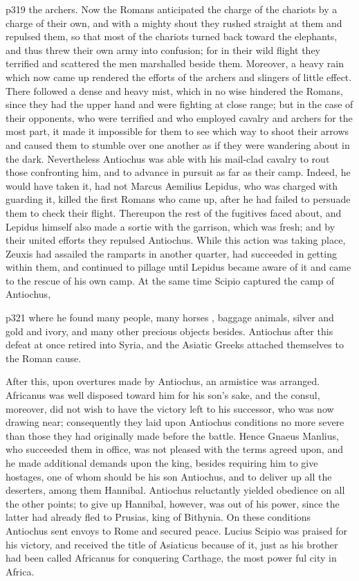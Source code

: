 p319 the archers. Now the Romans anticipated the charge of the chariots by a charge of their own, and with a mighty shout they rushed straight at them and repulsed them, so that most of the chariots turned back toward the elephants, and thus threw their own army into confusion; for in their wild flight they terrified and scattered the men marshalled beside them. Moreover, a heavy rain which now came up rendered the efforts of the archers and slingers of little effect. There followed a dense and heavy mist, which in no wise hindered the Romans, since they had the upper hand and were fighting at close range; but in the case of their opponents, who were terrified and who employed cavalry and archers for the most part, it made it impossible for them to see which way to shoot their arrows and caused them to stumble over one another as if they were wandering about in the dark. Nevertheless Antiochus was able with his mail-clad cavalry to rout those confronting him, and to advance in pursuit as far as their camp. Indeed, he would have taken it, had not Marcus Aemilius Lepidus, who was charged with guarding it, killed the first Romans who came up, after he had failed to persuade them to check their flight. Thereupon the rest of the fugitives faced about, and Lepidus himself also made a sortie with the garrison, which was fresh; and by their united efforts they repulsed Antiochus. While this action was taking place, Zeuxis had assailed the ramparts in another quarter, had succeeded in getting within them, and continued to pillage until Lepidus became aware of it and came to the rescue of his own camp. At the same time Scipio captured the camp of Antiochus,

p321 where he found many people, many horses , baggage animals, silver and gold and ivory, and many other precious objects besides. Antiochus after this defeat at once retired into Syria, and the Asiatic Greeks attached themselves to the Roman cause.

After this, upon overtures made by Antiochus, an armistice was arranged. Africanus was well disposed toward him for his son's sake, and the consul, moreover, did not wish to have the victory left to his successor, who was now drawing near; consequently they laid upon Antiochus conditions no more severe than those they had originally made before the battle. Hence Gnaeus Manlius, who succeeded them in office, was not pleased with the terms agreed upon, and he made additional demands upon the king, besides requiring him to give hostages, one of whom should be his son Antiochus, and to deliver up all the deserters, among them Hannibal. Antiochus reluctantly yielded obedience on all the other points; to give up Hannibal, however, was out of his power, since the latter had already fled to Prusias, king of Bithynia. On these conditions Antiochus sent envoys to Rome and secured peace. Lucius Scipio was praised for his victory, and received the title of Asiaticus because of it, just as his brother had been called Africanus for conquering Carthage, the most power ­ful city in Africa.

